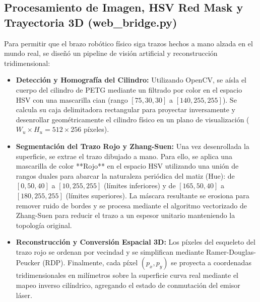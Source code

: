 \documentclass[conference,a4paper]{IEEEtran}
\begin{document}
\subsection{Procesamiento de Imagen, HSV Red Mask y Trayectoria 3D (web\_bridge.py)}
Para permitir que el brazo robótico físico siga trazos hechos a mano alzada en el mundo real, se diseñó un pipeline de visión artificial y reconstrucción tridimensional:
\begin{itemize}
    \item \textbf{Detección y Homografía del Cilindro:} Utilizando OpenCV, se aísla el cuerpo del cilindro de PETG mediante un filtrado por color en el espacio HSV con una mascarilla cian (rango $[75, 30, 30]$ a $[140, 255, 255]$). Se calcula su caja delimitadora rectangular para proyectar inversamente y desenrollar geométricamente el cilindro físico en un plano de visualización ($W_u \times H_u = 512 \times 256$ píxeles).
    \item \textbf{Segmentación del Trazo Rojo y Zhang-Suen:} Una vez desenrollada la superficie, se extrae el trazo dibujado a mano. Para ello, se aplica una mascarilla de color **Rojo** en el espacio HSV utilizando una unión de rangos duales para abarcar la naturaleza periódica del matiz (Hue): de $[0, 50, 40]$ a $[10, 255, 255]$ (límites inferiores) y de $[165, 50, 40]$ a $[180, 255, 255]$ (límites superiores). La máscara resultante se erosiona para remover ruido de bordes y se procesa mediante el algoritmo vectorizado de Zhang-Suen para reducir el trazo a un espesor unitario manteniendo la topología original.
    \item \textbf{Reconstrucción y Conversión Espacial 3D:} Los píxeles del esqueleto del trazo rojo se ordenan por vecindad y se simplifican mediante Ramer-Douglas-Peucker (RDP). Finalmente, cada píxel $(p_x, p_y)$ se proyecta a coordenadas tridimensionales en milímetros sobre la superficie curva real mediante el mapeo inverso cilíndrico, agregando el estado de conmutación del emisor láser.
\end{itemize}
\end{document}
